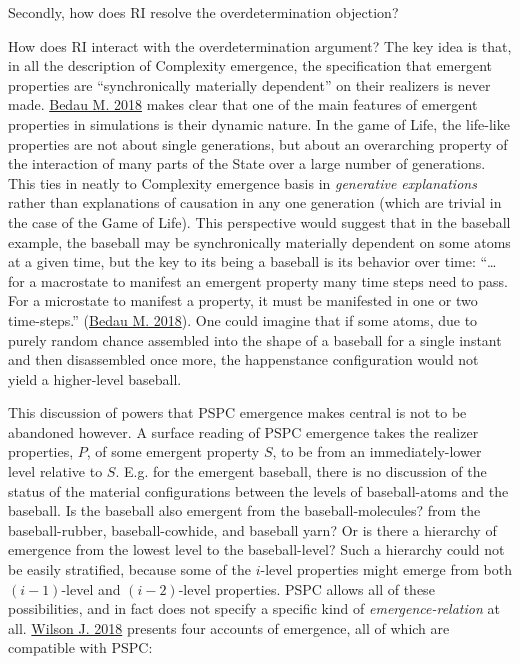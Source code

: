 \documentclass{article}
\newcommand{\ti}[1]{\textit{#1}}
\renewcommand{\cite}[1]{\hyperlink{#1}{#1}}
\begin{document}

Secondly, how does RI resolve the overdetermination objection? 



How does RI interact with the overdetermination argument? The key idea is that, in all the description of Complexity emergence, the specification that emergent properties are ``synchronically materially dependent'' on their realizers is never made. \cite{Bedau M. 2018} makes clear that one of the main features of emergent properties in simulations is their dynamic nature. In the game of Life, the life-like properties are not about single generations, but about an overarching property of the interaction of many parts of the State over a large number of generations. This ties in neatly to Complexity emergence basis in \ti{generative explanations} rather than explanations of causation in any one generation (which are trivial in the case of the Game of Life). This perspective would suggest that in the baseball example, the baseball may be synchronically materially dependent on some atoms at a given time, but the key to its being a baseball is its behavior over time: ``\dots for a macrostate to manifest an emergent property many time steps need to pass. For a microstate to manifest a property, it must be manifested in one or two time-steps.'' (\cite{Bedau M. 2018}). One could imagine that if some atoms, due to purely random chance assembled into the shape of a baseball for a single instant and then disassembled once more, the happenstance configuration would not yield a higher-level baseball.

This discussion of powers that PSPC emergence makes central is not to be abandoned however. A surface reading of PSPC emergence takes the realizer properties, $P$, of some emergent property $S$, to be from an immediately-lower level relative to $S$. E.g. for the emergent baseball, there is no discussion of the status of the material configurations between the levels of baseball-atoms and the baseball. Is the baseball also emergent from the baseball-molecules? from the baseball-rubber, baseball-cowhide, and baseball yarn? Or is there a hierarchy of emergence from the lowest level to the baseball-level? Such a hierarchy could not be easily stratified, because some of the $i$-level properties might emerge from both $(i-1)$-level and $(i-2)$-level properties. PSPC allows all of these possibilities, and in fact does not specify a specific kind of \ti{emergence-relation} at all. \cite{Wilson J. 2018} presents four accounts of emergence, all of which are compatible with PSPC:
\end{document}
